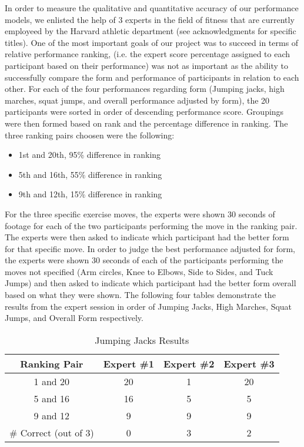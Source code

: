 In order to measure the qualitative and quantitative accuracy of our performance models, we enlisted the help of 3 experts in the field of fitness that are currently employeed by the Harvard athletic department (see acknowledgments for specific titles).  One of the most important goals of our project was to succeed in terms of relative performance ranking, (i.e. the expert score percentage assigned to each participant based on their performance) was not as important as the ability to successfully compare the form and performance of participants in relation to each other.  For each of the four performances regarding form (Jumping jacks, high marches, squat jumps, and overall performance adjusted by form), the 20 participants were sorted in order of descending performance score.  Groupings were then formed based on rank and the percentage difference in ranking.  The three ranking pairs choosen were the following: \\
\begin{itemize}
	\item{1st and 20th, 95\% difference in ranking} \\
	\item{5th and 16th, 55\% difference in ranking} \\
	\item{9th and 12th, 15\% difference in ranking} 
\end{itemize}
For the three specific exercise moves, the experts were shown 30 seconds of footage for each of the two participants performing the move in the ranking pair.  The experts were then asked to indicate which participant had the better form for that specific move.  In order to judge the best performance adjusted for form, the experts were shown 30 seconds of each of the participants performing the moves not specified (Arm circles, Knee to Elbows, Side to Sides, and Tuck Jumps) and then asked to indicate which participant had the better form overall based on what they were shown.  The following four tables demonstrate the results from the expert session in order of Jumping Jacks, High Marches, Squat Jumps, and Overall Form respectively.\\

\begin{table}[h!]
\caption{Jumping Jacks Results}
\centering
\begin{tabular}{c c c c}
\hline \hline
Ranking Pair & Expert \#1 & Expert \#2 & Expert \#3 \\ [0.5ex]
\hline
1 and 20 &		20&		1&		20 \\
5 and 16 &		16&		5&		5 \\
9 and 12 &		9&		9&		9 \\
\hline
\# Correct (out of 3)&		0&		3&		2 \\
\end{tabular}
\label{table:jumpingjacksresult}
\end{table}

